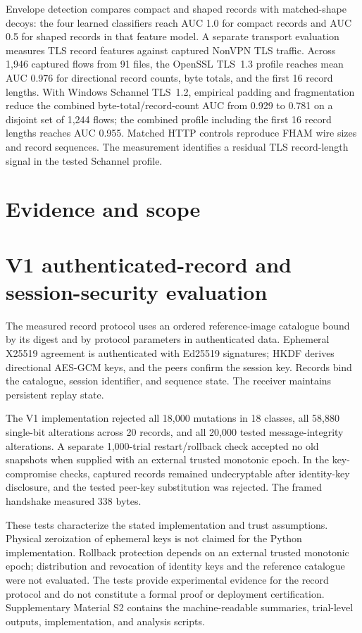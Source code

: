 ﻿\documentclass[11pt,a4paper]{article}
\begin{document}
Envelope detection compares compact and shaped records with matched-shape decoys: the four learned classifiers reach AUC 1.0 for compact records and AUC 0.5 for shaped records in that feature model. A separate transport evaluation measures TLS record features against captured NonVPN TLS traffic. Across 1,946 captured flows from 91 files, the OpenSSL TLS~1.3 profile reaches mean AUC 0.976 for directional record counts, byte totals, and the first 16 record lengths. With Windows Schannel TLS~1.2, empirical padding and fragmentation reduce the combined byte-total/record-count AUC from 0.929 to 0.781 on a disjoint set of 1,244 flows; the combined profile including the first 16 record lengths reaches AUC 0.955. Matched HTTP controls reproduce FHAM wire sizes and record sequences. The measurement identifies a residual TLS record-length signal in the tested Schannel profile.

\section{Evidence and scope}
\section{V1 authenticated-record and session-security evaluation}
The measured record protocol uses an ordered reference-image catalogue bound by its digest and by protocol parameters in authenticated data. Ephemeral X25519 agreement is authenticated with Ed25519 signatures; HKDF derives directional AES-GCM keys, and the peers confirm the session key. Records bind the catalogue, session identifier, and sequence state. The receiver maintains persistent replay state.

The V1 implementation rejected all 18,000 mutations in 18 classes, all 58,880 single-bit alterations across 20 records, and all 20,000 tested message-integrity alterations. A separate 1,000-trial restart/rollback check accepted no old snapshots when supplied with an external trusted monotonic epoch. In the key-compromise checks, captured records remained undecryptable after identity-key disclosure, and the tested peer-key substitution was rejected. The framed handshake measured 338 bytes.

These tests characterize the stated implementation and trust assumptions. Physical zeroization of ephemeral keys is not claimed for the Python implementation. Rollback protection depends on an external trusted monotonic epoch; distribution and revocation of identity keys and the reference catalogue were not evaluated. The tests provide experimental evidence for the record protocol and do not constitute a formal proof or deployment certification. Supplementary Material S2 contains the machine-readable summaries, trial-level outputs, implementation, and analysis scripts.
\end{document}
